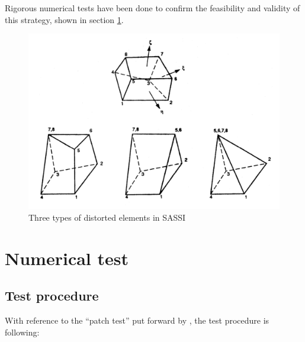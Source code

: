 \documentclass{article}
\begin{document}
Rigorous numerical tests have been done to confirm the feasibility and validity of this strategy, shown in section \ref{sec:numerical test}.   

\begin{figure}[H]
\begin{center}
\includegraphics[width=\textwidth]{images/SASSI_distorted_element.png}
\end{center}
\caption{\label{Fig:three types of distorted element} Three types of distorted elements in SASSI}
\end{figure}


\section{Numerical test}\label{sec:numerical test}

\subsection{Test procedure}

With reference to the ``patch test'' put forward by \cite{local-143}, the test procedure is following:
\end{document}

